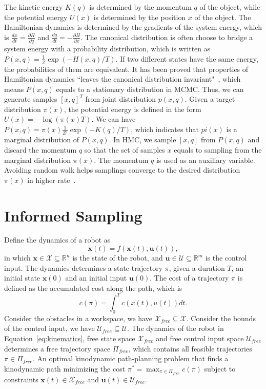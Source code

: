 \documentclass[letterpaper, 10 pt, conference]{ieeeconf}  %
\begin{document}
{The kinetic energy $ K(q) $ is determined by the momentum $ q $ of the object, while the potential energy $ U(x) $ is determined by the position $ x $ of the object.
The Hamiltonian dynamics is determined by the gradients of the system energy, which is
$ \frac{dx}{dt} = \frac{\partial H}{\partial q} $ and $ \frac{dq}{dt} = - \frac{\partial H}{\partial x} $.
%
The canonical distribution is often choose to bridge a system energy with a probability distribution, which is written as $ P(x, q) = \frac{1}{Z} \exp ( -H(x,q) / T ) $.
If two different states have the same energy, the probabilities of them are equivalent.
It has been proved that properties of Hamiltonian dynamics ``leaves the canonical distribution invariant"~\cite{N11}, which means $ P(x, q) $ equals to a stationary distribution in MCMC.
Thus, we can generate samples $ [ x , q ]^T $ from joint distribution $ p(x, q) $.
%
Given a target distribution $ \pi(x) $, the potential energy is defined in the form $  U(x) = - \log ( \pi(x) T ) $.
We can have $ P(x, q) = \pi(x) \frac{1}{Z'} \exp ( -K(q) / T ) $, which indicates that $ pi(x) $ is a marginal distribution of $ P(x, q) $.
In HMC, we sample $ [ x ,q ] $ from $ P(x, q) $ and discard the momentum $ q $ so that the set of samples $ x $ equals to sampling from the marginal distribution $ \pi(x) $.
The momentum $ q $ is used as an auxiliary variable.
Avoiding random walk helps samplings converge to the desired distribution $ \pi(x) $ in higher rate~\cite{N11}.
%
}

\section{Informed Sampling}
\label{sec:algorithm}

Define the dynamics of a robot as 
\begin{equation}
\label{eq:kinematics}
\dot{\bm{x}}(t) = f( \bm{x}(t) , \bm{u}(t) ), 
\end{equation}
in which $ \bm{x} \in \mathcal{X} \subseteq \mathbb{R}^n $ is the state of the robot, and $ \bm{u} \in \mathcal{U} \subseteq \mathbb{R}^m $ is the control input.
The dynamics determines a state trajectory $ \pi $, given a duration $ T $, an initial state $ \bm{x}(0) $ and an initial input $ \bm{u}(0) $.
The cost of a trajectory $ \pi $ is defined as the accumulated cost along the path, which is 
\begin{equation}
\label{eq:path_cost}
c(\pi) = \int_0^{T} c( x(t), u(t) ) dt.
\end{equation}
Consider the obstacles in a workspace, we have $ \mathcal{X}_{free} \subseteq \mathcal{X} $.
Consider the bounds of the control input, we have $ \mathcal{U}_{free} \subseteq \mathcal{U} $.
The dynamics of the robot in Equation~\eqref{eq:kinematics}, free state space $  \mathcal{X}_{free} $ and free control input space $ \mathcal{U}_{free} $ determines a free trajectory space $ \Pi_{free} $, which contains all feasible trajectories $ \pi \in \Pi_{free} $.
An optimal kinodynamic path-planning problem that finds a kinodynamic path minimizing the cost $ \pi^* = \max_{ \pi \in \Pi_{free} } c( \pi ) $ subject to constraints $ \bm{x} (t) \in \mathcal{X}_{free}  $ and $ \bm{u} (t) \in \mathcal{U}_{free} $.
\end{document}
